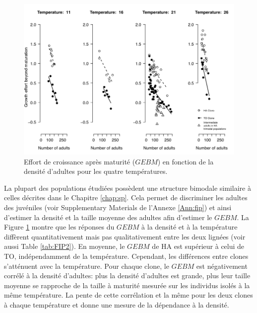 \begin{figure}[!ht]
\begin{center}
\includegraphics[width=\textwidth]{1_CorpsDeThese/Resumes/Fig/FIP05}
\caption[GEBM]{Effort de croissance
après maturité ($GEBM$) en fonction de la densité d'adultes pour les quatre
températures. }
\label{fig:FIP5}
\end{center}
\end{figure}

La plupart des populations étudiées possèdent une structure bimodale similaire à
celles décrites dans le Chapitre \ref{chap:sp}. Cela permet de discriminer les
adultes des juvéniles (voir Supplementary Materials de l'Annexe \ref{Ann:fip})
et ainsi d'estimer la densité et la taille moyenne des adultes afin d'estimer le
$GEBM$. La Figure \ref{fig:FIP5} montre que les réponses du $GEBM$ à la
densité et à la température diffèrent quantitativement mais pas qualitativement
entre les deux lignées (voir aussi Table \ref{tab:FIP2}). En moyenne, le $GEBM$
de HA est supérieur à celui de TO, indépendamment de la température. Cependant,
les différences entre clones s'atténuent avec la température. Pour chaque clone,
le $GEBM$ est négativement corrélé à la densité d'adultes: plus la densité
d'adultes est grande, plus leur taille moyenne se rapproche de la taille à
maturité mesurée sur les individus isolés à la même température. La pente de
cette corrélation et la même pour les deux clones à chaque température et donne
une mesure de la dépendance à la densité. 

